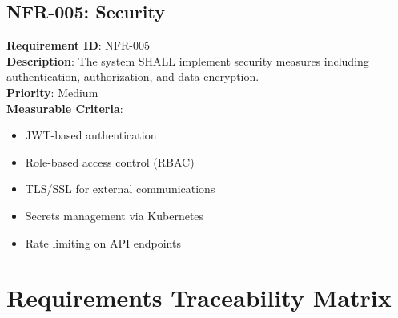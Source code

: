 \documentclass[12pt,a4paper]{article}
\begin{document}
\subsection{NFR-005: Security}
\textbf{Requirement ID}: NFR-005 \\
\textbf{Description}: The system SHALL implement security measures including authentication, authorization, and data encryption. \\
\textbf{Priority}: Medium \\
\textbf{Measurable Criteria}:
\begin{itemize}
    \item JWT-based authentication
    \item Role-based access control (RBAC)
    \item TLS/SSL for external communications
    \item Secrets management via Kubernetes
    \item Rate limiting on API endpoints
\end{itemize}

\section{Requirements Traceability Matrix}
\end{document}
